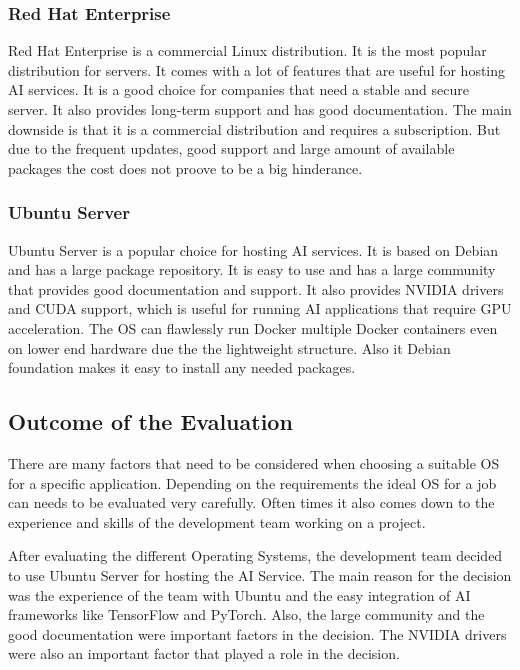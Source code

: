 \cite{LinuxForServerDebian}

\subsubsection{Red Hat Enterprise}

Red Hat Enterprise is a commercial Linux distribution. It is the most popular distribution for servers. It comes with a lot of features that are useful for hosting AI services. It is a good choice for companies that need a stable and secure server. It also provides long-term support and has good documentation.
The main downside is that it is a commercial distribution and requires a subscription. But due to the frequent updates, good support and large amount of available packages the cost does not proove to be a big hinderance.

\cite{LinuxForServerRedhat}

\subsubsection{Ubuntu Server}

Ubuntu Server is a popular choice for hosting AI services. It is based on Debian and has a large package repository. It is easy to use and has a large community that provides good documentation and support. It also provides NVIDIA drivers and CUDA support, which is useful for running AI applications that require GPU acceleration.
The OS can flawlessly run Docker multiple Docker containers even on lower end hardware due the the lightweight structure. Also it Debian foundation makes it easy to install any needed packages. 


\cite{lacroix2022mastering}


\subsection {Outcome of the Evaluation}

There are many factors that need to be considered when choosing a suitable OS for a specific application. Depending on the requirements the ideal OS for a job can needs to be evaluated very carefully. 
Often times it also comes down to the experience and skills of the development team working on a project. 

After evaluating the different Operating Systems, the development team decided to use Ubuntu Server for hosting the AI Service.
The main reason for the decision was the experience of the team with Ubuntu and the easy integration of AI frameworks like TensorFlow and PyTorch.
Also, the large community and the good documentation were important factors in the decision. The NVIDIA drivers were also an important factor that played a role in the decision.


